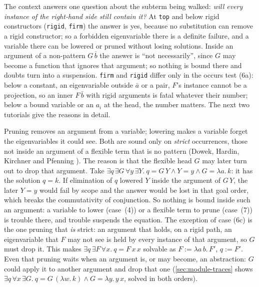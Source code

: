 \begin{tutorial}
The context answers one question about the subterm being walked: \emph{will every instance of the right-hand
side still contain it?} At \texttt{top} and below rigid constructors (\texttt{rigid}, \texttt{firm}) the answer is
yes, because no substitution can remove a rigid constructor; so a forbidden eigenvariable there is a definite
failure, and a variable there can be lowered or pruned without losing solutions. Inside an argument of a
non-pattern $G\,\bar b$ the answer is \enquote{not necessarily}, since $G$ may become a function that ignores
that argument; so nothing is bound there and doubts turn into a suspension. \texttt{firm} and \texttt{rigid}
differ only in the occurs test (6a): below a constant, an eigenvariable outside $\bar a$ or a pair, $F$'s instance
cannot be a projection, so an inner $F\,\bar b$ with rigid arguments is fatal whatever their number; below a
bound variable or an $a_i$ at the head, the number matters. The next two tutorials give the reasons in detail.
\end{tutorial}

\begin{tutorial}
Pruning removes an argument from a variable; lowering makes a variable forget the eigenvariables it could see.
Both are sound only on \emph{strict} occurrences, those not inside an argument of a flexible term that is no
pattern (Dowek, Hardin, Kirchner and Pfenning \cite{DowekHardinKirchnerPfenning1996}). The reason is that
the flexible head $G$ may later turn out to drop that argument. Take
$\exists q\,\exists G\,\forall y\,\exists Y.\ q = G\,Y \wedge Y = y \wedge G = \lambda a.\,k$: it has the solution
$q=k$. If elimination of $q$ lowered $Y$ inside the argument of $G\,Y$, the later $Y=y$ would fail by scope
and the answer would be lost in that goal order, which breaks the commutativity of conjunction. So nothing is
bound inside such an argument: a variable to lower (case~(4)) or a flexible term to prune (case~(7)) is trouble
there, and trouble suspends the equation. The exception of case
(6c) is the one pruning that \emph{is} strict: an argument that holds, on a rigid path, an eigenvariable that $F$
may not see is held by every instance of that argument, so $G$ must drop it. This makes
$\exists q\,\exists F\,\forall x.\ q = F\,x\,x$ solvable as $F := \lambda a\,b.\,F'$, $q := F'$. Even that
pruning waits when an argument is, or may become, an abstraction: $G$ could apply it to another argument and
drop that one (\cref{sec:module-traces} shows $\exists q\,\forall x\,\exists G.\ q = G\,(\lambda w.\,k)\wedge G =
\lambda y.\,y\,x$, solved in both orders).
\end{tutorial}

